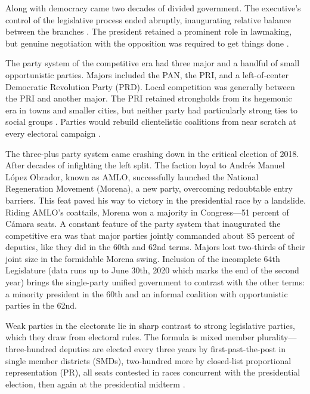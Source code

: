 \documentclass[letter,12pt]{article}
\begin{document}
Along with democracy came two decades of divided government. The executive's control of the legislative process ended abruptly, inaugurating relative balance between the branches \citep{weldon.1997,lujambio.1996}. The president retained a prominent role in lawmaking, but genuine negotiation with the opposition was required to get things done \citep{bejarQuienLegisla2012}. 

The party system of the competitive era had three major and a handful of small opportunistic parties. Majors included the PAN, the PRI, and a left-of-center Democratic Revolution Party (PRD). Local competition was generally between the PRI and another major. The PRI retained strongholds from its hegemonic era in towns and smaller cities, but neither party had particularly strong ties to social groups \citep{moreno.decisElec.2009}. Parties would rebuild clientelistic coalitions from near scratch at every electoral campaign \citep{diaz-estevez-magaloni-Poverty-book.2016}.

The three-plus party system came crashing down in the critical election of 2018. After decades of infighting the left split. The faction loyal to Andrés Manuel López Obrador, known as AMLO, successfully launched the National Regeneration Movement (Morena), a new party, overcoming redoubtable entry barriers. This feat paved his way to victory in the presidential race by a landslide. Riding AMLO's coattails, Morena won a majority in Congress---51 percent of Cámara seats. A constant feature of the party system that inaugurated the competitive era was that major parties jointly commanded about 85 percent of deputies, like they did in the 60th and 62nd terms. Majors lost two-thirds of their joint size in the formidable Morena swing. Inclusion of the incomplete 64th Legislature (data runs up to June 30th, 2020 which marks the end of the second year) brings the single-party unified government to contrast with the other terms: a minority president in the 60th and an informal coalition with opportunistic parties in the 62nd.


Weak parties in the electorate lie in sharp contrast to strong legislative parties, which they draw from electoral rules. The formula is mixed member plurality---three-hundred deputies are elected every three years by first-past-the-post in single member districts (SMDs), two-hundred more by closed-list proportional representation (PR), all seats contested in races concurrent with the presidential election, then again at the presidential midterm \citep{weldonMixedMemberSys2001}.
\end{document}
